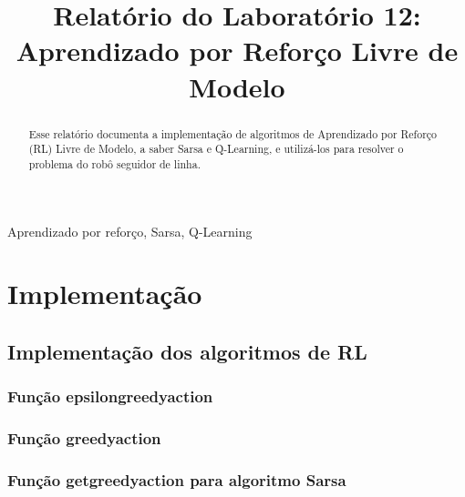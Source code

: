 \documentclass[conference]{IEEEtran}
\begin{document}
\title{Relatório do Laboratório 12: \\ Aprendizado por Reforço Livre de Modelo\\
}

\author{
}

\maketitle

\begin{abstract}
Esse relatório documenta a implementação de algoritmos de Aprendizado por Reforço (RL) Livre de Modelo, a saber Sarsa e Q-Learning, e utilizá-los para resolver o problema do robô seguidor de linha.
\end{abstract}

\begin{IEEEkeywords}
Aprendizado por reforço, Sarsa, Q-Learning
\end{IEEEkeywords}

\section{Implementação}

\subsection{Implementação dos algoritmos de RL}

\subsubsection{Função epsilon\underline{\space}greedy\underline{\space}action}

\subsubsection{Função greedy\underline{\space}action}

\subsubsection{Função get\underline{\space}greedy\underline{\space}action para algoritmo Sarsa}
\end{document}
